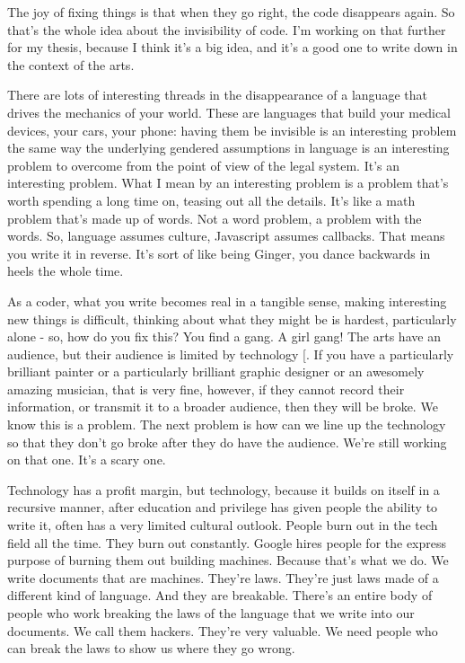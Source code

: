 The joy of fixing things is that when they go right, the code disappears again. So that's the whole idea about the invisibility of code. I'm working on that further for my thesis, because I think it's a big idea, and it's a good one to write down in the context of the arts.

There are lots of interesting threads in the disappearance of a language that drives the mechanics of your world. These are languages that build your medical devices, your cars, your phone: having them be invisible is an interesting problem the same way the underlying gendered assumptions in language is an interesting problem to overcome from the point of view of the legal system. It's an interesting problem. What I mean by an interesting problem is a problem that's worth spending a long time on, teasing out all the details. It's like a math problem that's made up of words. Not a word problem, a problem with the words. So, language assumes culture, Javascript assumes callbacks. That means you write it in reverse. It's sort of like being Ginger, you dance backwards in heels the whole time.

As a coder, what you write becomes real in a tangible sense, making interesting new things is difficult, thinking about what they might be is hardest, particularly alone - so, how do you fix this? You find a gang. A girl gang! The arts have an audience, but their audience is limited by technology [\cite{LISA notes}. If you have a particularly brilliant painter or a particularly brilliant graphic designer or an awesomely amazing musician, that is very fine, however, if they cannot record their information, or transmit it to a broader audience, then they will be broke. We know this is a problem. The next problem is how can we line up the technology so that they don't go broke after they do have the audience. We're still working on that one. It's a scary one. 

Technology has a profit margin, but technology, because it builds on itself in a recursive manner, after education and privilege has given people the ability to write it, often has a very limited cultural outlook. People burn out in the tech field all the time. They burn out constantly. Google hires people for the express purpose of burning them out building machines. Because that's what we do. We write documents that are machines. They're laws. They're just laws made of a different kind of language. And they are breakable. There's an entire body of people who work breaking the laws of the language that we write into our documents. We call them hackers. They're very valuable. We need people who can break the laws to show us where they go wrong. 

